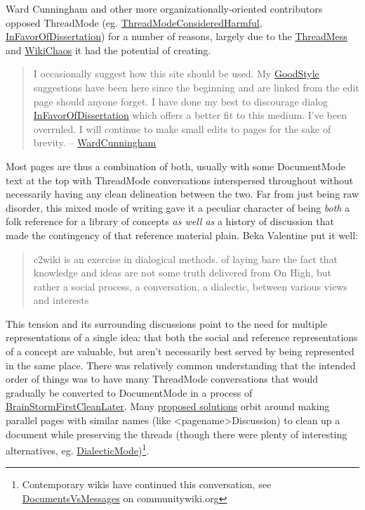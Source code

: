 \documentclass[10pt]{tufte-book}
\begin{document}
Ward Cunningham and other more organizationally-oriented contributors
opposed ThreadMode (eg.
\href{http://wiki.c2.com/?ThreadModeConsideredHarmful}{ThreadModeConsideredHarmful},
\href{http://wiki.c2.com/?InFavorOfDissertation}{InFavorOfDissertation})
for a number of reasons, largely due to the
\href{http://wiki.c2.com/?ThreadMess}{ThreadMess} and
\href{http://wiki.c2.com/?WikiChaos}{WikiChaos} it had the potential of
creating.

\begin{quote}
I occasionally suggest how this site should be used. My
\href{http://wiki.c2.com/?GoodStyle}{GoodStyle} suggestions have been
here since the beginning and are linked from the edit page should anyone
forget. I have done my best to discourage dialog
\href{http://wiki.c2.com/?InFavorOfDissertation}{InFavorOfDissertation}
which offers a better fit to this medium. I've been overruled. I will
continue to make small edits to pages for the sake of brevity. --
\href{http://wiki.c2.com/?WardCunningham}{WardCunningham} \citep{C2wikiWikiHistory} 
\end{quote}

Most pages are thus a combination of both, usually with some
DocumentMode text at the top with ThreadMode conversations interspersed
throughout without necessarily having any clean delineation between the
two. Far from just being raw disorder, this mixed mode of writing gave
it a peculiar character of being \emph{both} a folk reference for a
library of concepts \emph{as well as} a history of discussion that made
the contingency of that reference material plain. Beka Valentine put it
well:

\begin{quote}
c2wiki is an exercise in dialogical methods. of laying bare the fact
that knowledge and ideas are not some truth delivered from On High, but
rather a social process, a conversation, a dialectic, between various
views and interests \citep{valentineC2wikiExerciseDialogical2021} 
\end{quote}

This tension and its surrounding discussions point to the need for
multiple representations of a single idea: that both the social and
reference representations of a concept are valuable, but aren't
necessarily best served by being represented in the same place. There
was relatively common understanding that the intended order of things
was to have many ThreadMode conversations that would gradually be
converted to DocumentMode in a process of
\href{http://wiki.c2.com/?BrainStormFirstCleanLater}{BrainStormFirstCleanLater}.
Many \href{http://wiki.c2.com/?ConvertThreadModeToDocumentMode}{proposed
solutions} orbit around making parallel pages with similar names (like
\textless pagename\textgreater Discussion) to clean up a document while
preserving the threads (though there were plenty of interesting
alternatives, eg.
\href{http://wiki.c2.com/?DialecticMode}{DialecticMode})\footnote{Contemporary
  wikis have continued this conversation, see
  \href{https://communitywiki.org/wiki/DocumentsVsMessages}{DocumentsVsMessages}
  on communitywiki.org}.
\end{document}
